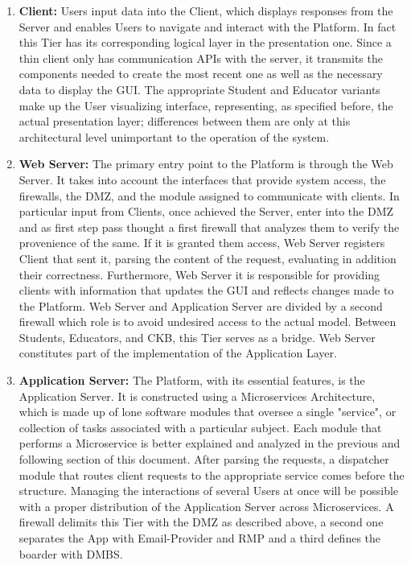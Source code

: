 \begin{enumerate}[label=$\bullet$]
    \item \textbf{Client:} Users input data into the Client, which displays responses from the Server and enables Users to navigate and interact with the Platform. In fact this Tier has its corresponding logical layer in the presentation one. 
    Since a thin client only has communication APIs with the server, it transmits the components needed to create the most recent one as well as the necessary data to display the GUI.
    The appropriate Student and Educator variants make up the User visualizing interface, representing, as specified before, the actual presentation layer; differences between them 
    are only at this architectural level unimportant to the operation of the system.
    \item \textbf{Web Server:} The primary entry point to the Platform is through the Web Server. It takes into account the interfaces that provide system access, the firewalls, the DMZ, and the module assigned to communicate with 
    clients. In particular input from Clients, once achieved the Server, enter into the DMZ and as first step pass thought a first firewall that analyzes them to verify the provenience of the same. If it is granted them access, Web Server registers Client that sent it, parsing the content of the request, evaluating in addition their correctness. 
    Furthermore, Web Server it is responsible for providing clients with information that updates the GUI and reflects changes made to the Platform. Web Server and Application Server are divided by a second firewall which role is to avoid undesired access to the actual model. Between Students, Educators, 
    and CKB, this Tier serves as a bridge. Web Server constitutes part of the implementation of the Application Layer.
    \item \textbf{Application Server:} The Platform, with its essential features, is the Application Server. It is constructed using a Microservices Architecture, which is made up of lone software modules that oversee a single 
    "service", or collection of tasks associated with a particular subject. Each module that performs a Microservice is better explained and analyzed in the previous and following section of this document. After parsing the requests, a dispatcher module that routes client requests to the appropriate service comes before the structure. Managing the interactions of several Users at once 
    will be possible with a proper distribution of the Application Server across Microservices. A firewall delimits this Tier with the DMZ as described above, a second one separates the App with Email-Provider and RMP and a third defines the boarder with DMBS.

\end{enumerate}
